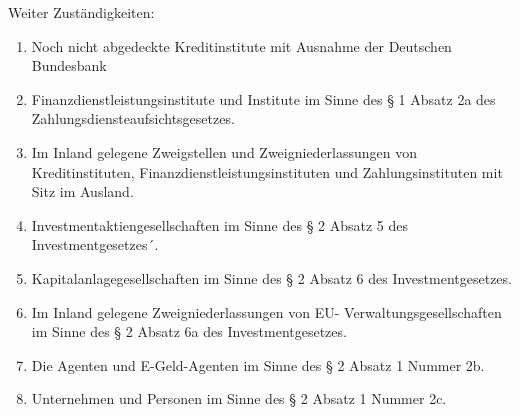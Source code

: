 \documentclass{article}
\begin{document}
\begin{enumerate}
                    Weiter Zuständigkeiten: 
                    \begin{enumerate}
                        \item
                            
                            Noch nicht abgedeckte Kreditinstitute mit Ausnahme der Deutschen Bundesbank

                        \item

                            Finanzdienstleistungsinstitute und Institute im Sinne des § 1 Absatz
                            2a des Zahlungsdiensteaufsichtsgesetzes.

                        \item

                            Im Inland gelegene Zweigstellen und Zweigniederlassungen von
                            Kreditinstituten, Finanzdienstleistungsinstituten und
                            Zahlungsinstituten mit Sitz im Ausland.

                        \item

                            Investmentaktiengesellschaften im Sinne des § 2 Absatz 5 des
                            Investmentgesetzes´.

                        \item

                            Kapitalanlagegesellschaften im Sinne des § 2 Absatz 6 des
                            Investmentgesetzes.

                        \item

                            Im Inland gelegene Zweigniederlassungen von EU-
                            Verwaltungsgesellschaften im Sinne des § 2 Absatz 6a des
                            Investmentgesetzes.

                        \item

                            Die Agenten und E-Geld-Agenten im Sinne des § 2 Absatz 1 Nummer 2b.

                        \item

                            Unternehmen und Personen im Sinne des § 2 Absatz 1 Nummer 2c.

                    \end{enumerate}


\end{enumerate}
\end{document}
